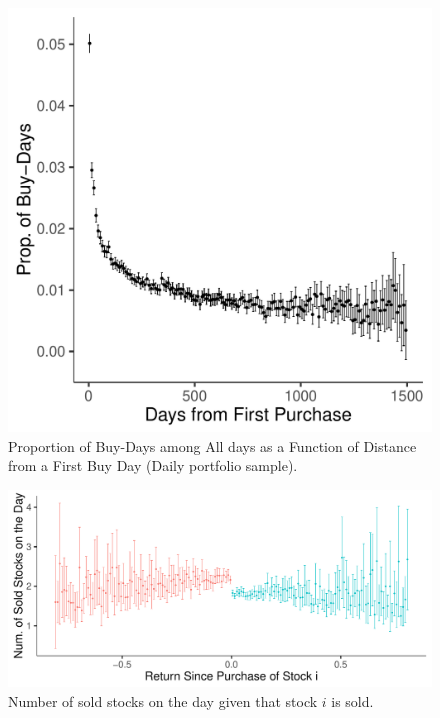\documentclass[11pt, a4paper]{article}
\begin{document}
\begin{appendices}
\begin{figure}[H]
	\centering
	\includegraphics[width=0.6\columnwidth]{barc_prop_buy_fr_first_buy.pdf}
	\caption{Proportion of Buy-Days among All days as a Function of Distance from a First Buy Day (Daily portfolio sample).}
	\label{figure:first_buy}
\end{figure}

\begin{figure}[H]
	\centering
	\includegraphics[width=0.8\columnwidth]{barc_num_sold_stocks_given_i_sold_sell_day_NG1_NL1_3.pdf}
	\caption{Number of sold stocks on the day given that stock $i$ is sold.}
	\label{figure:num_sold_given_i_sold}
\end{figure}



 



\end{appendices}

\pagebreak


\end{document}
